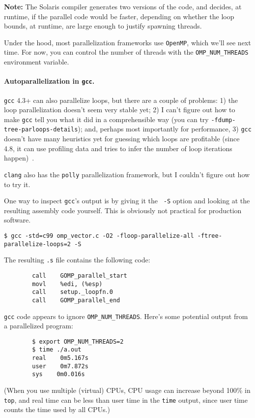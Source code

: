 {\bf Note:} The Solaris compiler generates two versions of the code,
and decides, at runtime, if the parallel code would be faster, depending on
whether the loop bounds, at runtime, are large enough to justify spawning
threads.

Under the hood, most parallelization frameworks use {\tt OpenMP},
which we'll see next time. For now, you can control the number of
threads with the {\tt OMP\_NUM\_THREADS} environment variable.

\paragraph{Autoparallelization in {\tt gcc}.} 
{\tt gcc} 4.3+ can also parallelize loops, but there are a couple of
problems: 1) the loop parallelization doesn't seem very stable yet; 2)
I can't figure out how to make {\tt gcc} tell you what it did in a comprehensible
way (you can try {\tt -fdump-tree-parloops-details}); and,
perhaps most importantly for performance, 3) {\tt gcc} doesn't have
many heuristics yet for guessing which loops are profitable (since 4.8, it can
use profiling data and tries to infer the number of loop iterations
happen)~\cite{autopar}.

{\tt clang} also has the {\tt polly} parallelization framework, but I couldn't
figure out how to try it.

One way to inspect {\tt gcc}'s output is by giving it the {\tt
  -S} option and looking at the resulting assembly code yourself. This
is obviously not practical for production software.
\begin{verbatim}
$ gcc -std=c99 omp_vector.c -O2 -floop-parallelize-all -ftree-parallelize-loops=2 -S           
\end{verbatim}

The resulting {\tt .s} file contains the following code:

\begin{verbatim}
        call    GOMP_parallel_start
        movl    %edi, (%esp)
        call    setup._loopfn.0
        call    GOMP_parallel_end
\end{verbatim}
{\tt gcc} code appears to ignore \verb+OMP_NUM_THREADS+.  Here's
some potential output from a parallelized program:
\begin{verbatim}
        $ export OMP_NUM_THREADS=2
        $ time ./a.out
        real    0m5.167s
        user    0m7.872s
        sys    0m0.016s
\end{verbatim}


(When you use multiple (virtual) CPUs, CPU usage can increase beyond
100\% in {\tt top}, and real time can be less than user time in
the {\tt time} output, since user time counts the time used by all CPUs.)

